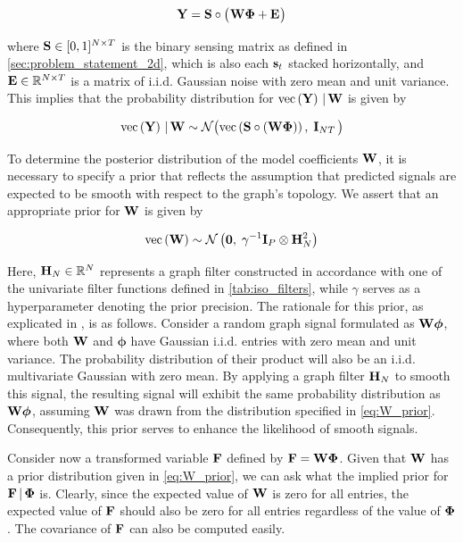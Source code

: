 \begin{equation}
    \mathbf{Y} = \mathbf{S} \circ \big( \mspace{1mu} \mathbf{W} \mathbf{\Phi} + \mathbf{E} \mspace{1mu} \big)
\end{equation}

where $\mathbf{S} \in [0, 1]^{N \times T}$ is the binary sensing matrix as defined in \cref{sec:problem_statement_2d}, which is also each $\mathbf{s}_t$ stacked horizontally, and $\mathbf{E} \in \mathbb{R}^{N \times T}$ is a matrix of i.i.d. Gaussian noise with zero mean and unit variance. This implies that the probability distribution for $\text{\textup{vec}}\left(\mathbf{Y}\right) \, | \, \mathbf{W}$ is given by 

\begin{equation}
    \text{\textup{vec}}\left(\mathbf{Y}\right) \, | \, \mathbf{W} \sim \mathcal{N}\big( \text{\textup{vec}}\left(\mathbf{S} \circ (\mathbf{W} \mathbf{\Phi})\right), \; \mathbf{I}_{NT} \, \big)
\end{equation}

To determine the posterior distribution of the model coefficients $\mathbf{W}$, it is necessary to specify a prior that reflects the assumption that predicted signals are expected to be smooth with respect to the graph's topology. We assert that an appropriate prior for $\mathbf{W}$ is given by

\begin{equation}
\label{eq:W_prior}
\text{\textup{vec}}\left(\mathbf{W}\right) \sim \mathcal{N}\left(\mathbf{0}, \; \gamma^{-1} \mathbf{I}_P \otimes \mathbf{H}_N^{2}\right)
\end{equation}

Here, $\mathbf{H}_N \in \mathbb{R}^{N}$ represents a graph filter constructed in accordance with one of the univariate filter functions defined in \cref{tab:iso_filters}, while $\gamma$ serves as a hyperparameter denoting the prior precision. The rationale for this prior, as explicated in \cite{Venkitaraman2020}, is as follows. Consider a random graph signal formulated as $\mathbf{W} \boldsymbol{\phi}$, where both $\mathbf{W}$ and $\boldsymbol{\phi}$ have Gaussian i.i.d. entries with zero mean and unit variance. The probability distribution of their product will also be an i.i.d. multivariate Gaussian with zero mean. By applying a graph filter $\mathbf{H}_N$ to smooth this signal, the resulting signal will exhibit the same probability distribution as $\mathbf{W} \boldsymbol{\phi}$, assuming $\mathbf{W}$ was drawn from the distribution specified in \cref{eq:W_prior}. Consequently, this prior serves to enhance the likelihood of smooth signals.



Consider now a transformed variable $\mathbf{F}$ defined by $\mathbf{F} = \mathbf{W} \mathbf{\Phi}$. Given that $\mathbf{W}$ has a prior distribution given in \cref{eq:W_prior}, we can ask what the implied prior for $\mathbf{F} \, | \, \mathbf{\Phi}$ is. Clearly, since the expected value of $\mathbf{W}$ is zero for all entries, the expected value of $\mathbf{F}$ should also be zero for all entries regardless of the value of $\mathbf{\Phi}$. The covariance of $\mathbf{F}$ can also be computed easily. 

